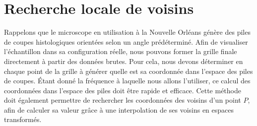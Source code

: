 {    \section{Recherche locale de voisins}\label{section:voisins}
    {

		Rappelons que le microscope en utilisation à la Nouvelle Orléans génère des piles de coupes histologiques orientées selon un angle prédéterminé. %
		Afin de visualiser l'échantillon dans sa configuration réelle, nous pouvons former la grille finale directement à partir des données brutes. Pour cela, nous devons déterminer en chaque point de la grille à générer quelle est sa coordonnée dans l'espace des piles de coupes. Étant donné la fréquence à laquelle nous allons l'utiliser, ce calcul des coordonnées dans l'espace des piles doit être rapide et efficace. Cette méthode doit également permettre de rechercher les coordonnées des voisins d'un point $P$, afin de calculer sa valeur grâce à une interpolation de ses voisins en espaces transformés.
		
}}
